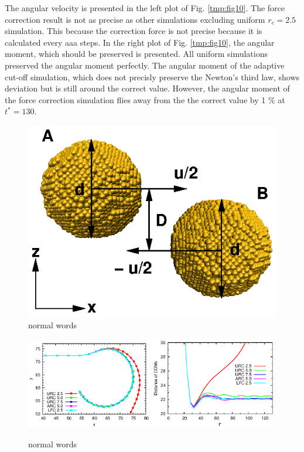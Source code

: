 \documentclass[aps,pre,preprint]{revtex4}
\newcommand{\recheck}[1]{{\color{red} #1}}
\begin{document}
The angular velocity is presented in the left plot of
Fig. \ref{tmp:fig10}. The force correction result is not as precise as
other simulations excluding uniform $r_c = 2.5$ simulation. This
because the correction force is not precise because it is calculated
every \recheck{aaa} steps. In the right plot of Fig. \ref{tmp:fig10},
the angular moment, which should be preserved is presented. All
uniform simulations preserved the angular moment perfectly. The
angular moment of the adaptive cut-off simulation, which does not
precisly preserve the Newton's third law, shows deviation but is still
around the correct value. However, the angular moment of the force
correction simulation flies away from the the correct value by 1 \% at
$t^\ast = 130$.


\begin{figure}
  \centering
  \includegraphics[]{fig/collision-init/init.2.eps}
  \caption{normal words}
  \label{fig:tmp7}
\end{figure}


\begin{figure}
  \centering
  \includegraphics[width=0.49\textwidth]{fig/trajs.eps}
  \includegraphics[width=0.49\textwidth]{fig/dists.eps}
  \caption{normal words}
  \label{fig:tmp9}
\end{figure}
\end{document}
